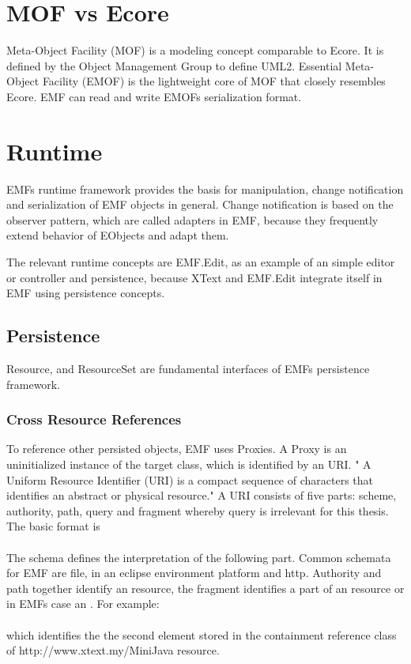 \section{MOF vs Ecore}
Meta-Object Facility (MOF) is a modeling concept comparable to Ecore. It is defined by the Object Management Group \cite{OMG} to define UML2. Essential Meta-Object Facility (EMOF) is the lightweight core of MOF that closely resembles Ecore. EMF can read and write EMOFs serialization format. \cite{EMP}

\section{Runtime}
EMFs runtime framework provides the basis for manipulation, change notification and serialization of EMF objects in general. \cite{EMF2nd} Change notification is based on the observer pattern, which are called adapters in EMF, because they frequently extend behavior of EObjects and adapt them.

The relevant runtime concepts are EMF.Edit, as an example of an simple editor or controller and persistence, because XText \cite{XTextMan} and EMF.Edit integrate itself in EMF using persistence concepts.

\subsection{Persistence}
Resource, and ResourceSet are fundamental interfaces of EMFs persistence framework.


\subsubsection{Cross Resource References}
To reference other persisted objects, EMF uses Proxies. A Proxy is an uninitialized instance of the target class, which is identified by an URI. " A Uniform Resource Identifier (URI) is a compact sequence of characters that identifies an abstract or physical resource."\cite{URI} A URI consists of five parts: scheme, authority, path, query and fragment whereby query is irrelevant for this thesis. The basic format is\\
 \\
The schema defines the interpretation of the following part. Common schemata for EMF are file, in an eclipse environment platform and http. Authority and path together identify an resource, the fragment identifies a part of an resource or in EMFs case an .
For example:\\
\\
which identifies the the second element stored in the containment reference class of http://www.xtext.my/MiniJava resource.


